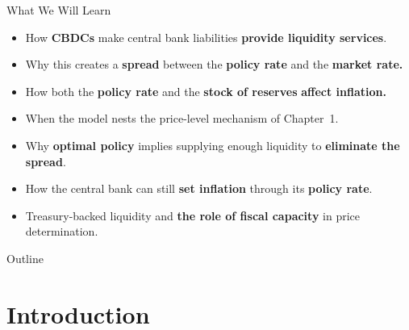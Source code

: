 \documentclass[11pt,aspectratio=169]{beamer}
\begin{document}
\begin{frame}{What We Will Learn}
\small

\begin{itemize}
  \item How \textbf{CBDCs} make central bank liabilities \textbf{provide liquidity services}.
  \item Why this creates a \textbf{spread} between the \textbf{policy rate} and the \textbf{market rate.}
\end{itemize}

\vspace{0.5em}

\begin{itemize}
  \item How both the \textbf{policy rate} and the \textbf{stock of reserves} \textbf{affect inflation.}
  \item When the model nests the price-level mechanism of Chapter~1.
\end{itemize}

\vspace{0.5em}

\begin{itemize}
  \item Why \textbf{optimal policy} implies supplying enough liquidity to \textbf{eliminate the spread}.
  \item How the central bank can still \textbf{set inflation} through its \textbf{policy rate}.
\end{itemize}

\vspace{0.5em}

\begin{itemize}
  \item Treasury-backed liquidity and \textbf{the role of fiscal capacity} in price determination.
\end{itemize}

\end{frame}

\begin{frame}{Outline}
\tableofcontents
\end{frame}
\section{Introduction}
\end{document}
